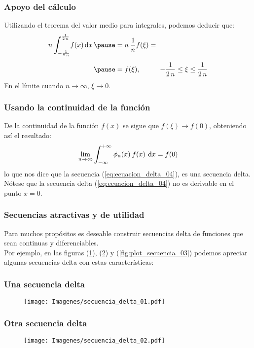 \documentclass[12pt]{beamer}
\begin{document}
\begin{frame}
\frametitle{Apoyo del cálculo}
Utilizando el teorema del valor medio para integrales, podemos deducir que:
\pause
\begin{eqnarray*}
\begin{aligned}
n \, \scaleint{6ex}_{\bs -\frac{1}{2 \, n}}^{\frac{1}{2 \, n}} f (x) \dd{x} \pause &= n \: \dfrac{1}{n} f (\xi) = \\[0.5em] \pause
&= f (\xi), \hspace{1cm} - \dfrac{1}{2 \, n} \leq \xi \leq \dfrac{1}{2 \, n}
\end{aligned}
\end{eqnarray*}
En el límite cuando $n \to \infty$, $\xi \to 0$.
\end{frame}

\begin{frame}
\frametitle{Usando la continuidad de la función}
De la continuidad de la función $f (x)$ se sigue que $f (\xi) \to f (0)$, obteniendo así el resultado:
\pause
\begin{align*}
\lim_{n \to \infty} \scaleint{6ex}_{\bs -\infty}^{+ \infty} \: \phi_{n} (x) \: f (x) \: \dd{x} = f (0)
\end{align*}
lo que nos dice que la secuencia (\ref{eq:ecuacion_delta_04}), es una secuencia delta. \pause  Nótese que la secuencia delta (\ref{eq:ecuacion_delta_04}) no es derivable en el punto $x = 0$.
\end{frame}

\begin{frame}
\frametitle{Secuencias atractivas y de utilidad}
Para muchos propósitos es deseable construir secuencias delta de funciones que sean continuas y diferenciables.
\\
\bigskip
\pause 
Por ejemplo, en las figuras (\ref{fig:plot_secuencia_01}), (\ref{fig:plot_secuencia_02}) y (\ref{fig:plot_secuencia_03}) podemos apreciar algunas secuencias delta con estas características:
\end{frame}

\begin{frame}
\frametitle{Una secuencia delta}
\begin{figure}[H]
    \centering
    \texttt{[image: Imagenes/secuencia\_delta\_01.pdf]}
    \label{fig:plot_secuencia_01}
\end{figure}
\end{frame}

\begin{frame}
\frametitle{Otra secuencia delta}
\begin{figure}[H]
    \centering
    \texttt{[image: Imagenes/secuencia\_delta\_02.pdf]}
    \label{fig:plot_secuencia_02}
\end{figure}
\end{frame}
\end{document}
